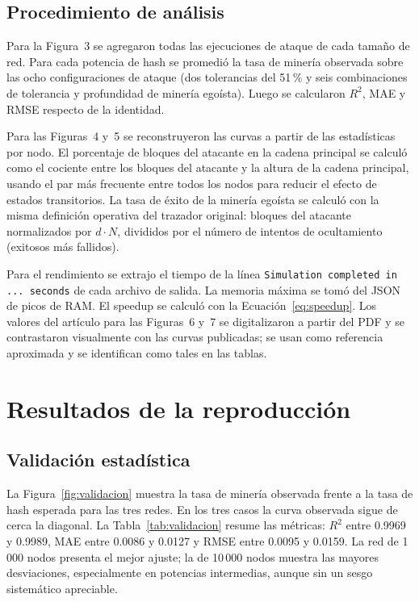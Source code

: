 \documentclass[11pt,a4paper,oneside]{article}
\begin{document}
\subsection{Procedimiento de análisis}

Para la Figura~3 se agregaron todas las ejecuciones de ataque de cada tamaño de red. Para cada potencia de hash se promedió la tasa de minería observada sobre las ocho configuraciones de ataque (dos tolerancias del 51\,\% y seis combinaciones de tolerancia y profundidad de minería egoísta). Luego se calcularon $R^2$, MAE y RMSE respecto de la identidad.

Para las Figuras~4 y~5 se reconstruyeron las curvas a partir de las estadísticas por nodo. El porcentaje de bloques del atacante en la cadena principal se calculó como el cociente entre los bloques del atacante y la altura de la cadena principal, usando el par más frecuente entre todos los nodos para reducir el efecto de estados transitorios. La tasa de éxito de la minería egoísta se calculó con la misma definición operativa del trazador original: bloques del atacante normalizados por $d \cdot N$, divididos por el número de intentos de ocultamiento (exitosos más fallidos).

Para el rendimiento se extrajo el tiempo de la línea \texttt{Simulation completed in ... seconds} de cada archivo de salida. La memoria máxima se tomó del JSON de picos de RAM. El speedup se calculó con la Ecuación~\eqref{eq:speedup}. Los valores del artículo para las Figuras~6 y~7 se digitalizaron a partir del PDF y se contrastaron visualmente con las curvas publicadas; se usan como referencia aproximada y se identifican como tales en las tablas.

\section{Resultados de la reproducción}
\label{sec:resultados}

\subsection{Validación estadística}

La Figura~\ref{fig:validacion} muestra la tasa de minería observada frente a la tasa de hash esperada para las tres redes. En los tres casos la curva observada sigue de cerca la diagonal. La Tabla~\ref{tab:validacion} resume las métricas: $R^2$ entre 0.9969 y 0.9989, MAE entre 0.0086 y 0.0127 y RMSE entre 0.0095 y 0.0159. La red de 1\,000 nodos presenta el mejor ajuste; la de 10\,000 nodos muestra las mayores desviaciones, especialmente en potencias intermedias, aunque sin un sesgo sistemático apreciable.
\end{document}
